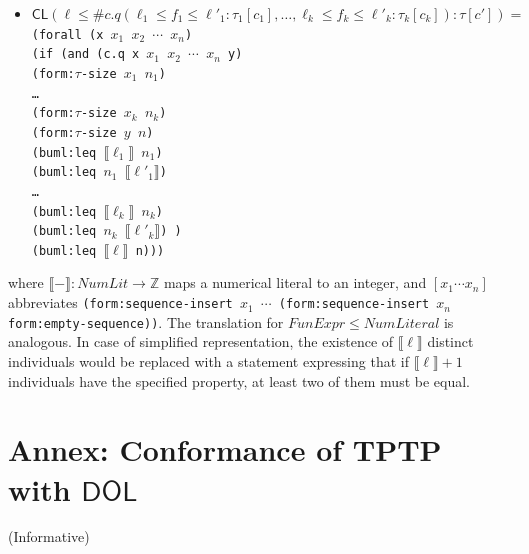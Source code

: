 \documentclass[10pt,fleqn,final]{scrreprt}
\newcommand*{\CL}{\ensuremath{\mathsf{CL}}\xspace}
\newcommand*{\DOL}{\ensuremath{\mathsf{DOL}}\xspace}
\newcommand{\informative}[0]{{\begin{center}{\Large{(Informative})}\end{center}} \bigskip}
\newcommand{\infannex}[1]{ \chapter{Annex: #1}  \informative }
\newenvironment{definitions}[0]{\medskip }{}
\newcommand{\ZZ}{\mathbb{Z}}
\newcommand{\sem}[1]{\mathopen\llbracket#1\mathclose\rrbracket}
\newcommand{\white}[1]{{\color{white}{#1}}}
\newcommand{\qqquad}{\white{x}\qquad}
\begin{document}
\begin{definitions}
\begin{itemize}
\item
$\CL(\ell \leq \mathsf{\#}c.q(\ell_1 \leq f_1 \leq \ell'_1: \tau_1[c_1], \ldots, \ell_k\leq f_k \leq \ell'_k: \tau_k[c_k]) : \tau[c'])=$\\
\texttt{(forall (x $x_1$ $x_2$ $\cdots$  $x_n$)\\
\qqquad  (if (and (c.q x $x_1$ $x_2$ $\cdots$  $x_n$ y) \\
\qqquad\qqquad\qquad (form:$\tau$-size $x_1$ $n_1$) \\
\qqquad\qqquad\qquad\ldots\\
\qqquad\qqquad\qquad (form:$\tau$-size $x_k$ $n_k$) \\
\qqquad\qqquad\qquad (form:$\tau$-size $y$ $n$) \\
\qqquad\qqquad\qquad (buml:leq $\sem{\ell_1}$ $n_1$)\\
\qqquad\qqquad\qquad (buml:leq $n_1$ $\sem{\ell'_1}$)\\
\qqquad\qqquad\qquad\ldots\\
\qqquad\qqquad\qquad (buml:leq $\sem{\ell_k}$ $n_k$)\\
\qqquad\qqquad\qquad (buml:leq $n_k$ $\sem{\ell'_k}$) )\\
\qqquad\qqquad (buml:leq $\sem{\ell}$ n)))}
\end{itemize}
%
where $\sem{-} : \mathit{NumLit} \to \ZZ$ maps a numerical literal
to an integer, and $[x_1\cdots x_n]$ abbreviates \texttt{(form:sequence-insert $x_1$ $\cdots$ (form:sequence-insert $x_n$ form:empty-sequence))}.
The translation for  $\mathit{FunExpr} \leq \mathit{NumLiteral}$
is analogous. In case of simplified representation,
the existence of $\sem{\ell}$ distinct individuals 
would be replaced
with a statement
expressing that if $\sem{\ell}+1$ individuals have the specified property,
at least two of them must be equal.





\infannex{Conformance of TPTP with \DOL}\label{a:TPTP}


\end{definitions}
\end{document}
